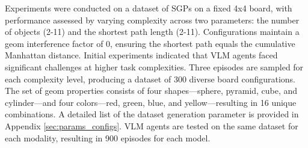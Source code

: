 Experiments were conducted on a dataset %
of SGPs on a fixed 4x4 board, with performance assessed by varying complexity across two parameters: the number of objects (2-11) and the shortest path length (2-11). Configurations maintain a geom interference factor of 0, ensuring the shortest path equals the cumulative Manhattan distance. Initial experiments indicated that VLM agents faced significant challenges at higher task complexities. Three episodes are sampled for each complexity level, producing a dataset of 300 diverse board configurations. The set of geom properties consists of four shapes—sphere, pyramid, cube, and cylinder—and four colors—red, green, blue, and yellow—resulting in 16 unique combinations. A detailed list of the dataset generation parameter is provided in Appendix \ref{sec:params_configs}. VLM agents are tested on the same dataset for each modality, resulting in 900 episodes for each model.